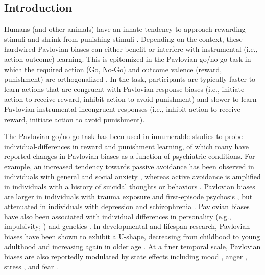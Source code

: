 \documentclass[a4paper,12pt]{article}
\begin{document}
\break
\setlength{\parindent}{0em}    %
\setlength{\parskip}{1em}      %
\begin{refsection}[main]       %

\section*{Introduction}

Humans (and other animals) have an innate tendency to approach rewarding stimuli and shrink from punishing stimuli \cite{carver1994behavioral}. Depending on the context, these hardwired Pavlovian biases can either benefit or interfere with instrumental (i.e., action-outcome) learning. This is epitomized in the Pavlovian go/no-go task in which the required action (Go, No-Go) and outcome valence (reward, punishment) are orthogonalized \cite{guitart2012go, guitart2014action}. In the task, participants are typically faster to learn actions that are congruent with Pavlovian response biases (i.e., initiate action to receive reward, inhibit action to avoid punishment) and slower to learn Pavlovian-instrumental incongruent responses (i.e., inhibit action to receive reward, initiate action to avoid punishment). %

The Pavlovian go/no-go task has been used in innumerable studies to probe individual-differences in reward and punishment learning, of which many have reported changes in Pavlovian biases as a function of psychiatric conditions. For example, an increased tendency towards passive avoidance has been observed in individuals with general and social anxiety \cite{mkrtchian2017modeling, peterburs2021impact}, whereas active avoidance is amplified in individuals with a history of suicidal thoughts or behaviors \cite{millner2019suicidal}. Pavlovian biases are larger in individuals with trauma exposure \cite{ousdal2018impact} and first-episode psychosis \cite{montagnese2020reinforcement}, but attenuated in individuals with depression \cite{huys2016specificity} and schizophrenia \cite{albrecht2016reduction}. Pavlovian biases have also been associated with individual differences in personality (e.g., impulsivity; \cite{eisinger2020pavlovian}) and genetics \cite{richter2014valenced, richter2021motivational}. In developmental and lifespan research, Pavlovian biases have been shown to exhibit a U-shape, decreasing from childhood to young adulthood and increasing again in older age \cite{raab2020adolescents, betts2020learning}. At a finer temporal scale, Pavlovian biases are also reportedly modulated by state effects including mood \cite{weber2022effects}, anger \cite{wonderlich2020anger}, stress \cite{de2016acute}, and fear \cite{mkrtchian2017threat}. 


\end{refsection}
\end{document}
